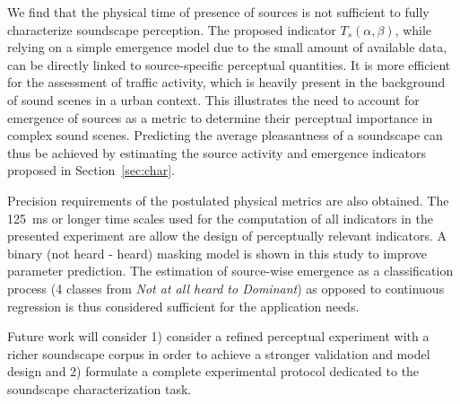 \documentclass{article}
\begin{document}
\begin{sloppy}
We find that the physical time of presence of sources is not sufficient to fully characterize soundscape perception. The proposed indicator $T_s(\alpha, \beta)$, while relying on a simple emergence model due to the small amount of available data, can be directly linked to source-specific perceptual quantities. It is more efficient for the assessment of traffic activity, which is heavily present in the background of sound scenes in a urban context. This illustrates the need to account for emergence of sources as a metric to determine their perceptual importance in complex sound scenes. Predicting the average pleasantness of a soundscape can thus be achieved by estimating the source activity and emergence indicators proposed in Section~\ref{sec:char}.

Precision requirements of the postulated physical metrics are also obtained. The 125~ms or longer time scales used for the computation of all indicators in the presented experiment are allow the design of perceptually relevant indicators. A binary (not heard - heard) masking model is shown in this study to improve parameter prediction. The estimation of source-wise emergence as a classification process (4 classes from \textit{Not at all heard to Dominant}) as opposed to continuous regression is thus considered sufficient for the application needs.

Future work will consider 1) consider a refined perceptual experiment with a richer soundscape corpus in order to achieve a stronger validation and model design and 2) formulate a complete experimental protocol dedicated to the soundscape characterization task.




\end{sloppy}
\end{document}

